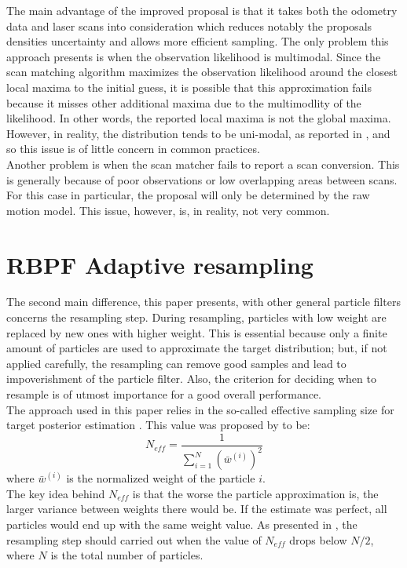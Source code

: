 \documentclass[letterpaper]{article}
\begin{document}
The main advantage of the improved proposal is that it takes both the odometry data and laser scans into consideration which reduces notably the proposals densities uncertainty and allows more efficient sampling. The only problem this approach presents is when the observation likelihood is multimodal. Since the scan matching algorithm maximizes the observation likelihood around the closest local maxima to the initial guess, it is possible that this approximation fails because it misses other additional maxima due to the multimodlity of the likelihood. In other words, the reported local maxima is not the global maxima. However, in reality, the distribution tends to be uni-modal, as reported in \cite{Cyrill}, and so this issue is of little concern in common practices.\\
Another problem is when the scan matcher fails to report a scan conversion. This is generally because of poor observations or low overlapping areas between scans. For this case in particular, the proposal will only be determined by the raw motion model. This issue, however, is, in reality, not very common.

\section{RBPF Adaptive resampling}

The second main difference, this paper presents, with other general particle filters concerns the resampling step. During resampling, particles with low weight are replaced by new ones with higher weight. This is essential because only a finite amount of particles are used to approximate the target distribution; but, if not applied carefully, the resampling can remove good samples and lead to impoverishment of the particle filter. Also, the criterion for deciding when to resample is of utmost importance for a good overall performance.\\
The approach used in this paper relies in the so-called effective sampling size for target posterior estimation \cite{Liu}. This value was proposed by \cite{Doucet13} to be:
\begin{equation}
N_{eff}= \frac{1}{\sum_{i=1}^N (\bar w^{(i)})^2}
\end{equation}
where $\bar w^{(i)}$ is the normalized weight of the particle $i$.\\
The key idea behind $N_{eff}$ is that the worse the particle approximation is, the larger variance between weights there would be.  If the estimate was perfect, all particles would end up with the same weight value. As presented in \cite{Cyrill}, the resampling step should carried out when the value of $N_{eff}$ drops below $N/2$, where $N$ is the total number of particles.
\end{document}
